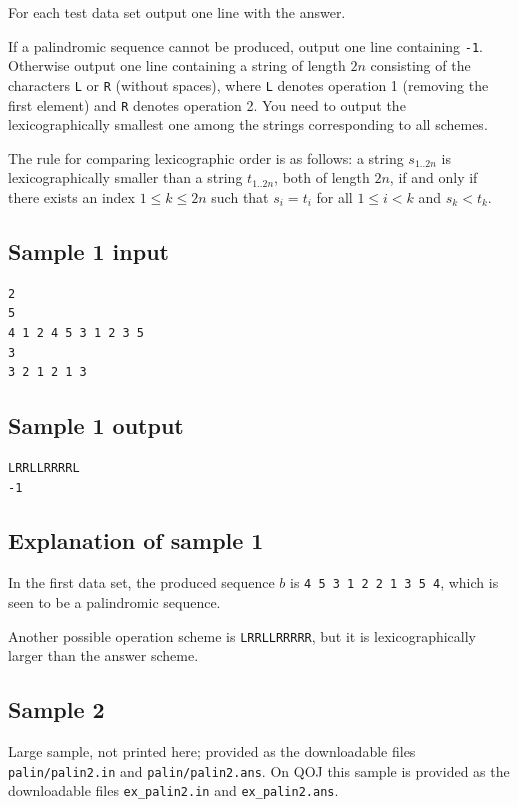 \documentclass[11pt]{article}
\begin{document}
For each test data set output one line with the answer.

If a palindromic sequence cannot be produced, output one line containing
\texttt{-1}.
Otherwise output one line containing a string of length $2n$ consisting of
the characters \texttt{L} or \texttt{R} (without spaces), where \texttt{L}
denotes operation 1 (removing the first element) and \texttt{R} denotes
operation 2.
You need to output the lexicographically smallest one among the strings
corresponding to all schemes.

The rule for comparing lexicographic order is as follows:
a string $s_{1..2n}$ is lexicographically smaller than a string
$t_{1..2n}$, both of length $2n$, if and only if there exists an index
$1 \le k \le 2n$ such that $s_i = t_i$ for all $1 \le i < k$ and
$s_k < t_k$.

\subsection*{Sample 1 input}

\begin{verbatim}
2
5
4 1 2 4 5 3 1 2 3 5
3
3 2 1 2 1 3
\end{verbatim}

\subsection*{Sample 1 output}

\begin{verbatim}
LRRLLRRRRL
-1
\end{verbatim}

\subsection*{Explanation of sample 1}

In the first data set, the produced sequence $b$ is
\texttt{4 5 3 1 2 2 1 3 5 4}, which is seen to be a palindromic sequence.

Another possible operation scheme is \texttt{LRRLLRRRRR}, but it is
lexicographically larger than the answer scheme.

\subsection*{Sample 2}

Large sample, not printed here;
provided as the downloadable files \texttt{palin/palin2.in} and \texttt{palin/palin2.ans}.
On QOJ this sample is provided as the downloadable files
\texttt{ex\_palin2.in} and \texttt{ex\_palin2.ans}.
\end{document}

